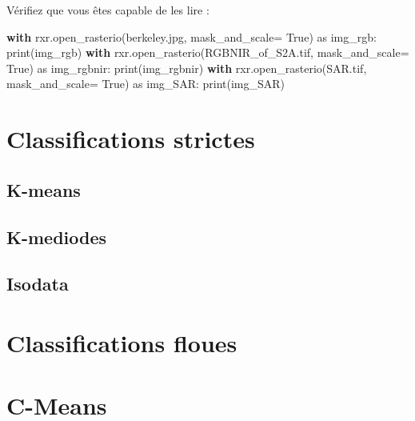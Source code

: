 \documentclass[
  11pt,
  letterpaper,
  open=any,
  twoside=false,
  french]{scrbook}
\newenvironment{Shaded}{\begin{snugshade}}{\end{snugshade}}
\newcommand{\BuiltInTok}[1]{\textcolor[rgb]{0.00,0.23,0.31}{#1}}
\newcommand{\ControlFlowTok}[1]{\textcolor[rgb]{0.00,0.23,0.31}{\textbf{#1}}}
\newcommand{\ImportTok}[1]{\textcolor[rgb]{0.00,0.46,0.62}{#1}}
\newcommand{\NormalTok}[1]{\textcolor[rgb]{0.00,0.23,0.31}{#1}}
\newcommand{\OperatorTok}[1]{\textcolor[rgb]{0.37,0.37,0.37}{#1}}
\newcommand{\StringTok}[1]{\textcolor[rgb]{0.13,0.47,0.30}{#1}}
\newcommand{\VariableTok}[1]{\textcolor[rgb]{0.07,0.07,0.07}{#1}}
\begin{document}
Vérifiez que vous êtes capable de les lire :

\begin{Shaded}
\begin{Highlighting}[]
\ControlFlowTok{with}\NormalTok{ rxr.open\_rasterio(}\StringTok{\textquotesingle{}berkeley.jpg\textquotesingle{}}\NormalTok{, mask\_and\_scale}\OperatorTok{=} \VariableTok{True}\NormalTok{) }\ImportTok{as}\NormalTok{ img\_rgb:}
    \BuiltInTok{print}\NormalTok{(img\_rgb)}
\ControlFlowTok{with}\NormalTok{ rxr.open\_rasterio(}\StringTok{\textquotesingle{}RGBNIR\_of\_S2A.tif\textquotesingle{}}\NormalTok{, mask\_and\_scale}\OperatorTok{=} \VariableTok{True}\NormalTok{) }\ImportTok{as}\NormalTok{ img\_rgbnir:}
    \BuiltInTok{print}\NormalTok{(img\_rgbnir)}
\ControlFlowTok{with}\NormalTok{ rxr.open\_rasterio(}\StringTok{\textquotesingle{}SAR.tif\textquotesingle{}}\NormalTok{, mask\_and\_scale}\OperatorTok{=} \VariableTok{True}\NormalTok{) }\ImportTok{as}\NormalTok{ img\_SAR:}
    \BuiltInTok{print}\NormalTok{(img\_SAR)}
\end{Highlighting}
\end{Shaded}

\section{Classifications strictes}\label{sec-061}

\subsection{K-means}\label{sec-0611}

\subsection{K-mediodes}\label{sec-0612}

\subsection{Isodata}\label{sec-0613}

\section{Classifications floues}\label{sec-062}

\section{C-Means}\label{sec-0621}
\end{document}
